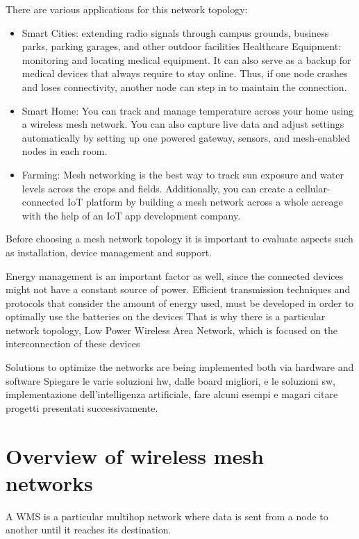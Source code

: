 		There are various applications for this network topology:
		\begin{itemize}[noitemsep]
			\item Smart Cities: extending radio signals through campus grounds, business parks, parking garages, and other outdoor facilities
			Healthcare Equipment: monitoring and locating medical equipment. It can also serve as a backup for medical devices that always require to stay online. Thus, if one node crashes and loses connectivity, another node can step in to maintain the connection.
			\item Smart Home: You can track and manage temperature across your home using a wireless mesh network. You can also capture live data and adjust settings automatically by setting up one powered gateway, sensors, and mesh-enabled nodes in each room.
			\item Farming: Mesh networking is the best way to track sun exposure and water levels across the crops and fields. Additionally, you can create a cellular-connected IoT platform by building a mesh network across a whole acreage with the help of an IoT app development company.
		\end{itemize}

		Before choosing a mesh network topology it is important to evaluate aspects such as installation, device management and support.
		
		Energy management is an important factor as well, since the connected devices might not have a constant source of power.		
		Efficient transmission techniques and protocols that consider the amount of energy used, must be developed in order to optimally use the batteries on the devices		
		That is why there is a particular network topology, Low Power Wireless Area Network, which is focused on the interconnection of these devices
		
		Solutions to optimize the networks are being implemented both via hardware and software
		Spiegare le varie soluzioni hw, dalle board migliori, e le soluzioni sw, implementazione dell'intelligenza artificiale, fare alcuni esempi e magari citare progetti presentati successivamente.
	
	\section{Overview of wireless mesh networks}
	
		A WMS is a particular multihop network where data is sent from a node to another until it reaches its destination.
		
